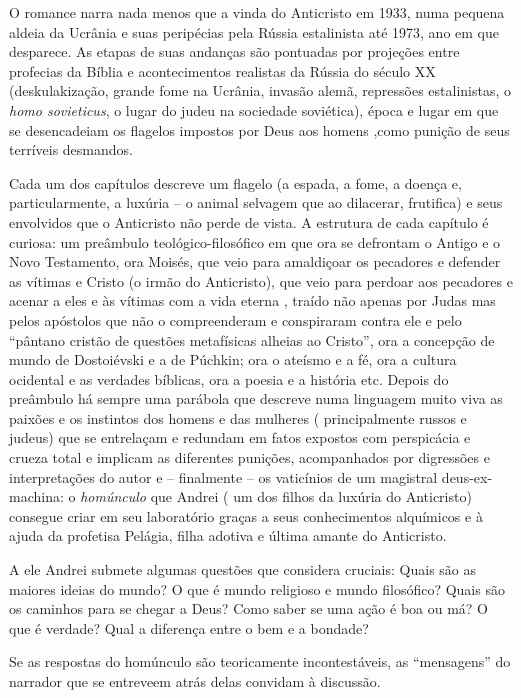 O romance narra nada menos que a vinda do Anticristo em 1933, numa
pequena aldeia da Ucrânia e suas peripécias pela Rússia estalinista até
1973, ano em que desparece. As etapas de suas andanças são pontuadas por
projeções entre profecias da Bíblia e acontecimentos realistas da Rússia
do século XX (deskulakização, grande fome na Ucrânia, invasão alemã,
repressões estalinistas, o \emph{homo sovieticus}, o lugar do judeu na
sociedade soviética), época e lugar em que se desencadeiam os flagelos
impostos por Deus aos homens ,como punição de seus terríveis desmandos.

Cada um dos capítulos descreve um flagelo (a espada, a fome, a doença e,
particularmente, a luxúria -- o animal selvagem que ao dilacerar,
frutifica) e seus envolvidos que o Anticristo não perde de vista. A
estrutura de cada capítulo é curiosa: um preâmbulo teológico-filosófico
em que ora se defrontam o Antigo e o Novo Testamento, ora Moisés, que
veio para amaldiçoar os pecadores e defender as vítimas e Cristo (o
irmão do Anticristo), que veio para perdoar aos pecadores e acenar a
eles e às vítimas com a vida eterna , traído não apenas por Judas mas
pelos apóstolos que não o compreenderam e conspiraram contra ele e pelo
``pântano cristão de questões metafísicas alheias ao Cristo'', ora a
concepção de mundo de Dostoiévski e a de Púchkin; ora o ateísmo e a fé,
ora a cultura ocidental e as verdades bíblicas, ora a poesia e a
história etc. Depois do preâmbulo há sempre uma parábola que descreve
numa linguagem muito viva as paixões e os instintos dos homens e das
mulheres ( principalmente russos e judeus) que se entrelaçam e redundam
em fatos expostos com perspicácia e crueza total e implicam as
diferentes punições, acompanhados por digressões e interpretações do
autor e -- finalmente -- os vaticínios de um magistral deus-ex-machina:
o \emph{homúnculo} que Andrei ( um dos filhos da luxúria do Anticristo)
consegue criar em seu laboratório graças a seus conhecimentos alquímicos
e à ajuda da profetisa Pelágia, filha adotiva e última amante do
Anticristo.

A ele Andrei submete algumas questões que considera cruciais: Quais são
as maiores ideias do mundo? O que é mundo religioso e mundo filosófico?
Quais são os caminhos para se chegar a Deus? Como saber se uma ação é
boa ou má? O que é verdade? Qual a diferença entre o bem e a bondade?

Se as respostas do homúnculo são teoricamente incontestáveis, as
``mensagens'' do narrador que se entreveem atrás delas convidam à
discussão.

